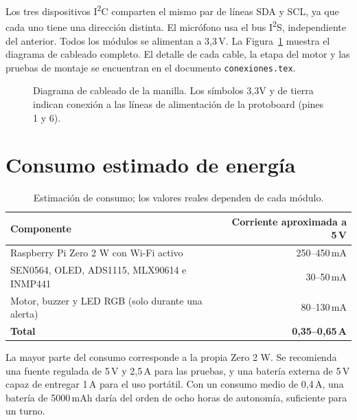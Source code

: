 \documentclass[11pt,a4paper]{article}
\begin{document}
Los tres dispositivos I\textsuperscript{2}C comparten el mismo par de líneas SDA y
SCL, ya que cada uno tiene una dirección distinta. El micrófono usa el bus
I\textsuperscript{2}S, independiente del anterior. Todos los módulos se alimentan
a 3{,}3\,V. La Figura~\ref{fig:cableado} muestra el diagrama de cableado completo.
El detalle de cada cable, la etapa del motor y las pruebas de montaje se
encuentran en el documento \texttt{conexiones.tex}.

\begin{figure}[p]
\centering
\resizebox{\textwidth}{!}{}
\caption{Diagrama de cableado de la manilla. Los símbolos 3,3V y de tierra
indican conexión a las líneas de alimentación de la protoboard (pines 1 y 6).}
\label{fig:cableado}
\end{figure}

\section{Consumo estimado de energía}
\label{sec:energia}

\begin{table}[H]
\centering
\small
\begin{tabular}{@{}lr@{}}
\toprule
\textbf{Componente} & \textbf{Corriente aproximada a 5\,V} \\
\midrule
Raspberry Pi Zero 2 W con Wi-Fi activo            & 250--450\,mA \\
SEN0564, OLED, ADS1115, MLX90614 e INMP441        & 30--50\,mA \\
Motor, buzzer y LED RGB (solo durante una alerta) & 80--130\,mA \\
\midrule
\textbf{Total}                                    & \textbf{0{,}35--0{,}65\,A} \\
\bottomrule
\end{tabular}
\caption{Estimación de consumo; los valores reales dependen de cada módulo.}
\end{table}

La mayor parte del consumo corresponde a la propia Zero 2 W. Se recomienda una
fuente regulada de 5\,V y 2{,}5\,A para las pruebas, y una batería externa de
5\,V capaz de entregar 1\,A para el uso portátil. Con un consumo medio de
0{,}4\,A, una batería de 5000\,mAh daría del orden de ocho horas de autonomía,
suficiente para un turno.

\end{document}
